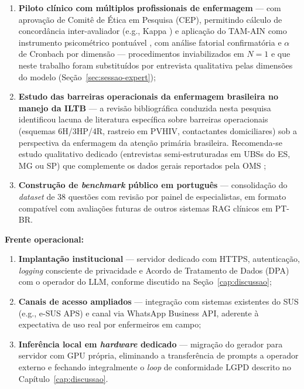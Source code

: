 \documentclass[
  12pt,
  oneside,
  a4paper,
  english,
  brazil
]{abntex2}
\begin{document}
\begin{enumerate}[label=\textbf{TF\arabic*}, start=6]
  \item \textbf{Piloto clínico com múltiplos profissionais de enfermagem} ---
        com aprovação de Comitê de Ética em Pesquisa (CEP), permitindo
        cálculo de concordância inter-avaliador (e.g., Kappa
        \cite{landis1977}) e aplicação do TAM-AIN como instrumento
        psicométrico pontuável \cite{nursingTAM2024}, com análise fatorial
        confirmatória e $\alpha$ de Cronbach por dimensão --- procedimentos
        inviabilizados em $N=1$ e que neste trabalho foram substituídos por
        entrevista qualitativa pelas dimensões do modelo
        (Seção~\ref{sec:sessao-expert});
  \item \textbf{Estudo das barreiras operacionais da enfermagem brasileira
        no manejo da ILTB} --- a revisão bibliográfica conduzida nesta
        pesquisa identificou lacuna de literatura específica sobre
        barreiras operacionais (esquemas 6H/3HP/4R, rastreio em PVHIV,
        contactantes domiciliares) sob a perspectiva da enfermagem da
        atenção primária brasileira. Recomenda-se estudo qualitativo
        dedicado (entrevistas semi-estruturadas em UBSs do ES, MG ou SP)
        que complemente os dados gerais reportados pela OMS
        \cite{who2018, who2020consolidatedTB, who2023};
  \item \textbf{Construção de \textit{benchmark} público em português} ---
        consolidação do \textit{dataset} de 38 questões com revisão por painel
        de especialistas, em formato compatível com avaliações futuras de
        outros sistemas RAG clínicos em PT-BR.
\end{enumerate}

\textbf{Frente operacional:}

\begin{enumerate}[label=\textbf{TF\arabic*}, start=9]
  \item \textbf{Implantação institucional} --- servidor dedicado com HTTPS,
        autenticação, \textit{logging} consciente de privacidade e Acordo de
        Tratamento de Dados (DPA) com o operador do LLM, conforme discutido na
        Seção~\ref{cap:discussao};
  \item \textbf{Canais de acesso ampliados} --- integração com sistemas
        existentes do SUS (e.g., e-SUS APS) e canal via WhatsApp Business API,
        aderente à expectativa de uso real por enfermeiros em campo;
  \item \textbf{Inferência local em \textit{hardware} dedicado} --- migração do
        gerador para servidor com GPU própria, eliminando a transferência de
        prompts a operador externo e fechando integralmente o
        \textit{loop} de conformidade LGPD descrito no
        Capítulo~\ref{cap:discussao}.
\end{enumerate}
\end{document}
